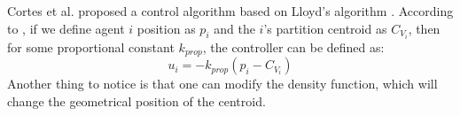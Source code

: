 \documentclass{iacas}
\begin{document}
Cortes et al. proposed a control algorithm based on Lloyd's algorithm \cite{Cortes2004}. According to \cite{Cortes2004}, if we define agent $i$ position as $p_i$ and the $i$'s partition centroid as $C_{V_{i}}$, then for some proportional constant $k_{prop}$, the controller can be defined as:
\begin{equation} \label{LloydsContol}
u_{i} = -k_{prop}\left( p_i - C_{V_{i}} \right)
\end{equation} 
%
Another thing to notice is that one can modify the density function, which will change the geometrical position of the centroid.

\end{document}
